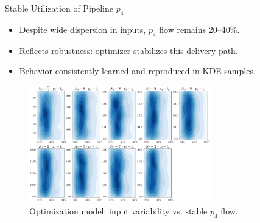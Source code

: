 \documentclass[hyperref={colorlinks,citecolor=blue,linkcolor=blue,urlcolor=blue}]{beamer}
\begin{document}
\begin{frame}{Stable Utilization of Pipeline $p_4$}
\scriptsize
    \begin{itemize}
        \item Despite wide dispersion in inputs, $p_4$ flow remains 20--40\%.
        \item Reflects robustness: optimizer stabilizes this delivery path.
        \item Behavior consistently learned and reproduced in KDE samples.
    \end{itemize}
    \begin{figure}
        \includegraphics[width=0.7\textwidth]{figures/inputs_outputs_1.png}
        \caption{\scriptsize Optimization model: input variability vs. stable $p_4$ flow.}
    \end{figure}
\end{frame}
\end{document}
